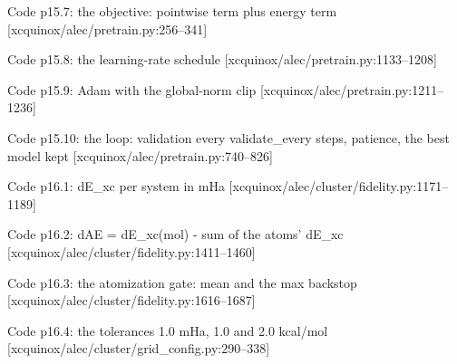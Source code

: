 \begin{frame}[allowframebreaks]{Code p15.7: the objective: pointwise term plus energy term [xcquinox/alec/pretrain.py:256--341]}
\label{code:p15_7_the_objective_pointwise_term_plus_energy}
\end{frame}
\begin{frame}[allowframebreaks]{Code p15.8: the learning-rate schedule [xcquinox/alec/pretrain.py:1133--1208]}
\label{code:p15_8_the_learning_rate_schedule}
\end{frame}
\begin{frame}[allowframebreaks]{Code p15.9: Adam with the global-norm clip [xcquinox/alec/pretrain.py:1211--1236]}
\label{code:p15_9_adam_with_the_global_norm_clip}
\end{frame}
\begin{frame}[allowframebreaks]{Code p15.10: the loop: validation every validate\_every steps, patience, the best model kept [xcquinox/alec/pretrain.py:740--826]}
\label{code:p15_10_the_loop_validation_every_validate_every}
\end{frame}
\begin{frame}[allowframebreaks]{Code p16.1: dE\_xc per system in mHa [xcquinox/alec/cluster/fidelity.py:1171--1189]}
\label{code:p16_1_de_xc_per_system_in_mha}
\end{frame}
\begin{frame}[allowframebreaks]{Code p16.2: dAE = dE\_xc(mol) - sum of the atoms' dE\_xc [xcquinox/alec/cluster/fidelity.py:1411--1460]}
\label{code:p16_2_dae_de_xc_mol_sum_of_the_atoms_de_xc}
\end{frame}
\begin{frame}[allowframebreaks]{Code p16.3: the atomization gate: mean and the max backstop [xcquinox/alec/cluster/fidelity.py:1616--1687]}
\label{code:p16_3_the_atomization_gate_mean_and_the_max_ba}
\end{frame}
\begin{frame}[allowframebreaks]{Code p16.4: the tolerances 1.0 mHa, 1.0 and 2.0 kcal/mol [xcquinox/alec/cluster/grid\_config.py:290--338]}
\label{code:p16_4_the_tolerances_1_0_mha_1_0_and_2_0_kcal}
\end{frame}
